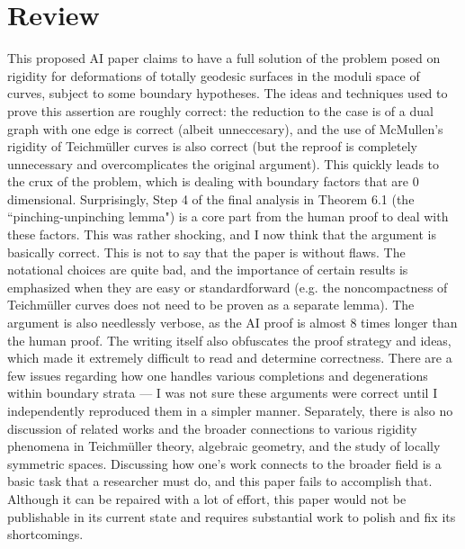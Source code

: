 \documentclass[11pt]{article}
\theoremstyle{remark}
\begin{document}
\maketitle

\section{Review}
This proposed AI paper claims to have a full solution of the problem posed on rigidity for deformations of totally geodesic surfaces in the moduli space of curves, subject to some boundary hypotheses. The ideas and techniques used to prove this assertion are roughly correct: the reduction to the case is of a dual graph with one edge is correct (albeit unneccesary), and the use of McMullen's rigidity of Teichm\"uller curves is also correct (but the reproof is completely unnecessary and overcomplicates the original argument). This quickly leads to the crux of the problem, which is dealing with boundary factors that are $0$ dimensional. Surprisingly, Step 4 of the final analysis in Theorem 6.1 (the ``pinching-unpinching lemma") is a core part from the human proof to deal with these factors. This was rather shocking, and I now think that the argument is basically correct. This is not to say that the paper is without flaws. The notational choices are quite bad, and the importance of certain results is emphasized when they are easy or standardforward (e.g. the noncompactness of Teichm\"uller curves does not need to be proven as a separate lemma). The argument is also needlessly verbose, as the AI proof is almost 8 times longer than the human proof. The writing itself also obfuscates the proof strategy and ideas, which made it extremely difficult to read and determine correctness. There are a few issues regarding how one handles various completions and degenerations within boundary strata --- I was not sure these arguments were correct until I independently reproduced them in a simpler manner. Separately, there is also no discussion of related works and the broader connections to various rigidity phenomena in Teichm\"uller theory, algebraic geometry, and the study of locally symmetric spaces. Discussing how one's work connects to the broader field is a basic task that a researcher must do, and this paper fails to accomplish that. Although it can be repaired with a lot of effort, this paper would not be publishable in its current state and requires substantial work to polish and fix its shortcomings. 
\end{document}
